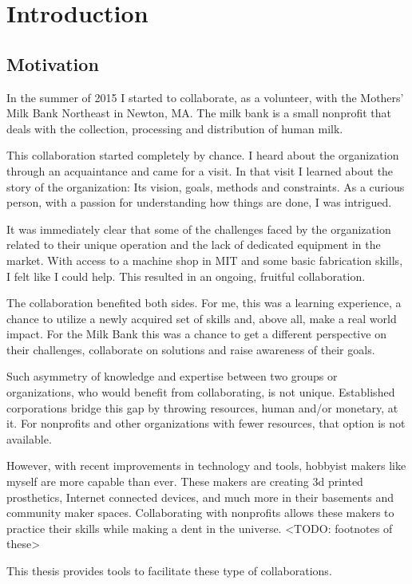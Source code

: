 \chapter{Introduction}
\label{chap_intro}

\section{Motivation}
In the summer of 2015 I started to collaborate, as a volunteer, with the Mothers’ Milk Bank Northeast in Newton, MA. The milk bank is a small nonprofit that deals with the collection, processing and distribution of human milk.

This collaboration started completely by chance. I heard about the organization through an acquaintance and came for a visit. In that visit I learned about the story of the organization: Its vision, goals, methods and constraints. As a curious person, with a passion for understanding how things are done, I was intrigued. 

It was immediately clear that some of the challenges faced by the organization related to their unique operation and the lack of dedicated equipment in the market. With access to a machine shop in MIT and some basic fabrication skills, I felt like I could help. This resulted in an ongoing, fruitful collaboration. 

The collaboration benefited both sides. For me, this was a learning experience, a chance to utilize a newly acquired set of skills and, above all, make a real world impact. For the Milk Bank this was a chance to get a different perspective on their challenges, collaborate on solutions and raise awareness of their goals.   

Such asymmetry of knowledge and expertise between two groups or organizations, who would benefit from collaborating, is not unique. Established corporations bridge this gap by throwing resources, human and/or monetary, at it. For nonprofits and other organizations with fewer resources, that option is not available.

However, with recent improvements in technology and tools, hobbyist makers like myself are more capable than ever. These makers are creating 3d printed prosthetics, Internet connected devices, and much more in their basements and community maker spaces. Collaborating with nonprofits allows these makers to practice their skills while making a dent in the universe. <TODO: footnotes of these>

This thesis provides tools to facilitate these type of collaborations.


